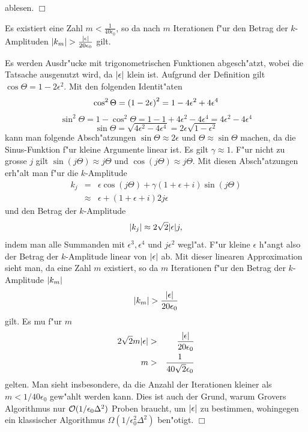              ablesen. \hfill $\Box$
             \begin{lemma}
               Es existiert eine Zahl $m < \frac{1}{40\epsilon_0}$, so da\3 nach $m$ Iterationen f"ur den Betrag der $k$-Amplituden 
               $\vert k_m \vert > \frac{\vert \epsilon \vert}{20\epsilon_0}$ gilt.
             \end{lemma}    
             \beweis Es werden Ausdr"ucke mit trigonometrischen Funktionen abgesch"atzt, wobei die Tatsache ausgenutzt wird, da\3 $\vert \epsilon \vert$ klein ist. 
             Aufgrund der Definition gilt $\cos\Theta=1 - 2\epsilon^2$. Mit den folgenden Identit"aten 
             $$
               \cos^2\Theta = \left( 1 - 2\epsilon \right)^2 = 1-4\epsilon^2+4\epsilon^4 \\
             $$
             $$
               \sin^2\Theta = 1 - \cos^2\Theta = 1 - 1 + 4\epsilon^2 - 4\epsilon^4 = 4\epsilon^2 - 4\epsilon^4 
             $$
             $$
                 \sin\Theta = \sqrt{4\epsilon^2 - 4\epsilon^4} = 2\epsilon\sqrt{1-\epsilon^2}
             $$ 
             kann man folgende Absch"atzungen $\sin\Theta \approx 2\epsilon$ und $\Theta \approx \sin\Theta$ machen, da die Sinus-Funktion f"ur kleine Argumente linear ist.
             Es gilt $\gamma \approx 1$. F"ur nicht zu grosse $j$ gilt $\sin(j\Theta) \approx j\Theta$ und $\cos(j\Theta) \approx j\Theta$. 
             Mit diesen Absch"atzungen erh"alt man f"ur die $k$-Amplitude
             \begin{eqnarray*}
                      k_j   & =       & \epsilon\cos(j\Theta)+\gamma\left(1+\epsilon+i\right)\sin(j\Theta) \\
                            & \approx & \epsilon + (1 + \epsilon + i)2j\epsilon
             \end{eqnarray*}
             und den Betrag der $k$-Amplitude
             $$ \vert k_j \vert \approx 2\sqrt{2}\vert \epsilon \vert j, $$
             indem man alle Summanden mit $\epsilon^3, \epsilon^4$ und $j\epsilon^2$ wegl"a\3t.
             F"ur kleine $\epsilon$ h"angt also der Betrag der $k$-Amplitude linear von $\vert \epsilon \vert$ ab. 
             Mit dieser linearen Approximation sieht man, da\3 eine Zahl $m$ existiert, so da\3 $m$ Iterationen f"ur den Betrag der $k$-Amplitude $\vert k_m \vert$
             $$ \vert k_m \vert > \frac{\vert \epsilon \vert}{20\epsilon_0} $$ gilt.
             Es mu\3 f"ur $m$ 
             \begin{eqnarray*}
               2\sqrt{2}m\vert \epsilon \vert & > & \frac{\vert \epsilon \vert}{20\epsilon_0} \\
                                        m  & > & \frac{1}{40\sqrt{2} \epsilon_0}
             \end{eqnarray*} 
             gelten. Man sieht insbesondere, da\3 die Anzahl der Iterationen kleiner als $m < 1/40\epsilon_0$ gew"ahlt werden kann.
             Dies ist auch der Grund, warum Grovers Algorithmus nur ${\cal O}(1/\epsilon_0 \Delta^2)$ 
             Proben braucht, um $\vert \epsilon \vert$ zu bestimmen, wohingegen ein klassischer Algorithmus $\Omega(1/\epsilon_0^2\Delta^2)$
             ben"otigt. \hfill $\Box$
             
